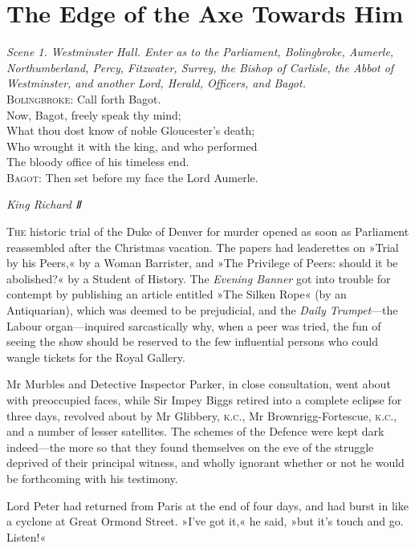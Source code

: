 

\chapter{The Edge of the Axe Towards Him}

\epigraph{
\textit{Scene 1. Westminster Hall. Enter as to the Parliament, Bolingbroke, Aumerle, Northumberland, Percy, Fitzwater, Surrey, the Bishop of Carlisle, the Abbot of Westminster, and another Lord, Herald, Officers, and Bagot.}\\
\textsc{Bolingbroke}: Call forth Bagot.\\
\indent Now, Bagot, freely speak thy mind;\\
\indent What thou dost know of noble Gloucester's death;\\
\indent Who wrought it with the king, and who performed\\
The bloody office of his timeless end.\\
\textsc{Bagot}: Then set before my face the Lord Aumerle.}{\textit{King Richard Ⅱ}}


\lettrine[lines=4]{T}{he} historic trial of the Duke of Denver for murder opened as soon as Parliament reassembled after the Christmas vacation. The papers had leaderettes on »Trial by his Peers,« by a Woman Barrister, and »The Privilege of Peers: should it be abolished?« by a Student of History.  The \textit{Evening Banner} got into trouble for contempt by publishing an article entitled »The Silken Rope« (by an Antiquarian), which was deemed to be prejudicial, and the \textit{Daily Trumpet}—the Labour organ—inquired sarcastically why, when a peer was tried, the fun of seeing the show should be reserved to the few influential persons who could wangle tickets for the Royal Gallery.

Mr Murbles and Detective Inspector Parker, in close consultation, went about with preoccupied faces, while Sir Impey Biggs retired into a complete eclipse for three days, revolved about by Mr Glibbery, \textsc{k.c.}, Mr Brownrigg-Fortescue, \textsc{k.c.}, and a number of lesser satellites. The schemes of the Defence were kept dark indeed—the more so that they found themselves on the eve of the struggle deprived of their principal witness, and wholly ignorant whether or not he would be forthcoming with his testimony.

Lord Peter had returned from Paris at the end of four days, and had burst in like a cyclone at Great Ormond Street. »I've got it,« he said, »but it's touch and go. Listen!«

